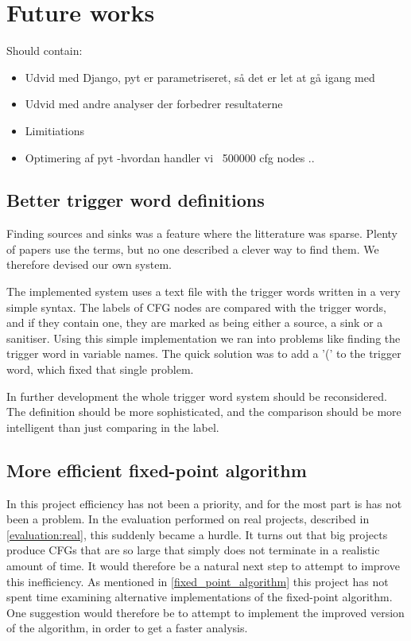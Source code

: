 \section{Future works}

Should contain:
\begin{itemize}
\item Udvid med Django, pyt er parametriseret, så det er let at gå igang med
\item Udvid med andre analyser der forbedrer resultaterne
\item Limitiations
\item Optimering af pyt -hvordan handler vi ~500000 cfg nodes ..
\end{itemize}

\subsection{Better trigger word definitions}
Finding sources and sinks was a feature where the litterature was sparse.
Plenty of papers use the terms, but no one described a clever way to find them.
We therefore devised our own system.

The implemented system uses a text file with the trigger words written in a very simple syntax.
The labels of CFG nodes are compared with the trigger words, and if they contain one, they are marked as being either a source, a sink or a sanitiser.
Using this simple implementation we ran into problems like finding the trigger word in variable names.
The quick solution was to add a '(' to the trigger word, which fixed that single problem.

In further development the whole trigger word system should be reconsidered.
The definition should be more sophisticated, and the comparison should be more intelligent than just comparing in the label.

\subsection{More efficient fixed-point algorithm}
In this project efficiency has not been a priority, and for the most part is has not been a problem.
In the evaluation performed on real projects, described in \cref{evaluation:real}, this suddenly became a hurdle.
It turns out that big projects produce CFGs that are so large that \pyt{} simply does not terminate in a realistic amount of time.
It would therefore be a natural next step to attempt to improve this inefficiency.
As mentioned in \cref{fixed_point_algorithm} this project has not spent time examining alternative implementations of the fixed-point algorithm.
One suggestion would therefore be to attempt to implement the improved version of the algorithm, in order to get a faster analysis.
